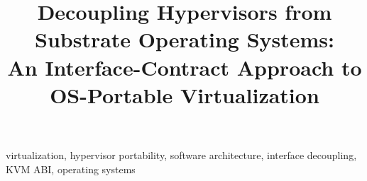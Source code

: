 \documentclass[conference]{IEEEtran}
\begin{document}
\title{Decoupling Hypervisors from Substrate Operating Systems:\\
An Interface-Contract Approach to OS-Portable Virtualization}

\author{
}

\maketitle



\begin{IEEEkeywords}
virtualization, hypervisor portability, software architecture,
interface decoupling, KVM ABI, operating systems
\end{IEEEkeywords}











\end{document}
